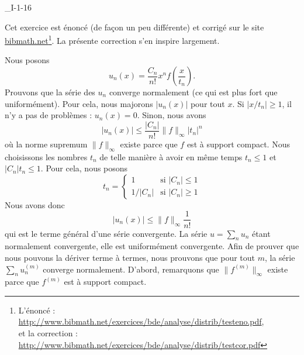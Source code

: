 

\begin{corrige}{_I-1-16}

	Cet exercice est énoncé (de façon un peu différente) et corrigé sur le site \href{http://www.bibmath.net}{bibmath.net}\footnote{L'énoncé : \href{http://www.bibmath.net/exercices/bde/analyse/distrib/testeno.pdf}{http://www.bibmath.net/exercices/bde/analyse/distrib/testeno.pdf},\\ et la correction : \href{http://www.bibmath.net/exercices/bde/analyse/distrib/testcor.pdf}{http://www.bibmath.net/exercices/bde/analyse/distrib/testcor.pdf}}. La présente correction s'en inspire largement.

	Nous posons
	\begin{equation}
		u_n(x)=\frac{ C_n }{ n! }x^nf(\frac{ x }{ t_n }).
	\end{equation}
	Prouvons que la série des $u_n$ converge normalement (ce qui est plus fort que uniformément). Pour cela, nous majorons $| u_n(x) |$ pour tout $x$. Si $| x/t_n |\geq 1$, il n'y a pas de problèmes : $u_n(x)=0$. Sinon, nous avons
	\begin{equation}		\label{EqMajorationBorel16}
		| u_n(x) |\leq\frac{ | C_n | }{ n! }\| f \|_{\infty}| t_n |^n
	\end{equation}
	où la norme supremum $\| f \|_{\infty}$ existe parce que $f$ est à support compact. Nous choisissons les nombres $t_n$ de telle manière à avoir en même temps $t_n\leq 1$ et $| C_n |t_n\leq 1$. Pour cela, nous posons
	\begin{equation}
		t_n=\begin{cases}
			1       & \text{si }|C_n|\leq 1   \\
			1/|C_n| & \text{si }| C_n |\geq 1
		\end{cases}
	\end{equation}
	Nous avons donc
	\begin{equation}
		| u_n(x) |\leq \| f \|_{\infty}\frac{1}{ n! }
	\end{equation}
	qui est le terme général d'une série convergente. La série $u=\sum_n u_n$ étant normalement convergente, elle est uniformément convergente. Afin de prouver que nous pouvons la dériver terme à termes, nous prouvons que pour tout $m$, la série $\sum_n u_n^{(m)}$ converge normalement. D'abord, remarquons que $\| f^{(m)} \|_{\infty}$ existe parce que $f^{(m)}$ est à support compact.


\end{corrige}
